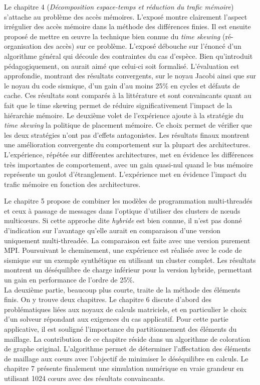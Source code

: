 \documentclass[a4paper,12pt]{article}
\begin{document}
Le chapitre 4 (\textit{Décomposition espace-temps et réduction 
du trafic mémoire}) s'attache au problème des accès mémoires.
L'exposé montre clairement l'aspect irrégulier des accès mémoire
dans la méthode des différences finies. Il est ensuite proposé
de mettre en {\oe}uvre la technique bien connue du \emph{time skewing}
(ré-organisation des accès) sur ce problème. 
L'exposé débouche sur l'énoncé d'un algorithme
général qui découle des contraintes du cas d'espèce.
Bien qu'introduit pédagogiquement, on aurait aimé que celui-ci
soit formalisé.
L'évaluation est approfondie, montrant des résultats convergents, 
sur le noyau Jacobi ainsi que sur le noyau du code sismique,
d'un gain d'au moins 25\% en cycles et défauts de cache. 
Ces résultats sont comparés à la littérature et sont convaincants
quant au fait que le time skewing permet de réduire significativement
l'impact de la hiérarchie mémoire. 
Le deuxième volet de l'expérience ajoute à la stratégie du \emph{time skewing}
la politique de placement mémoire. Ce choix permet de vérifier que 
les deux stratégies n'ont pas d'effets antagonistes. 
Les résultats finaux montrent une amélioration convergente du 
comportement sur la plupart des architectures. L'expérience,
répétée sur différentes architectures, met en évidence 
les différences très importantes de comportement, avec
un gain quasi-nul quand le bus mémoire représente un 
goulot d'étranglement.  
L'expérience met en évidence l'impact du trafic mémoire en fonction
des architectures. 

Le chapitre 5 propose de combiner les modèles de programmation
multi-threadés et ceux à passage de messages dans l'optique d'utiliser
des clusters de n{\oe}uds multic{\oe}urs. Si cette approche dite
\emph{hybride} est bien connue, il n'est pas donné d'indication
sur l'avantage qu'elle aurait en comparaison d'une version 
uniquement multi-threadée.
La comparaison est faite avec une version purement MPI.
Poursuivant le cheminement, une expérience est réalisée avec 
le code de sismique sur un
exemple synthétique en utilisant un cluster complet. 
Les résultats montrent un déséquilibre de charge inférieur pour
la version hybride, permettant un gain en performance de l'ordre
de 25\%.\\


La deuxième partie, beaucoup plus courte, traite de la méthode
des éléments finis. On y trouve deux chapitres.
Le chapitre 6 discute d'abord des problématiques liées aux noyaux 
de calculs matriciels, et en particulier le choix d'un solveur
répondant aux exigences du cas applicatif. Pour cette partie
applicative, il est souligné l'importance du partitionnement
des éléments du maillage. La contribution de ce chapitre réside 
dans un algorithme de coloration de graphe original. 
L'algorithme permet de déterminer l'affectation des éléments de 
maillage aux c{\oe}urs avec l'objectif de minimiser le déséquilibre
en calculs.
Le chapitre 7 présente finalement une simulation numérique en
vraie grandeur en utilisant 1024 c{\oe}urs avec des résultats
convaincants.
 
\end{document}
